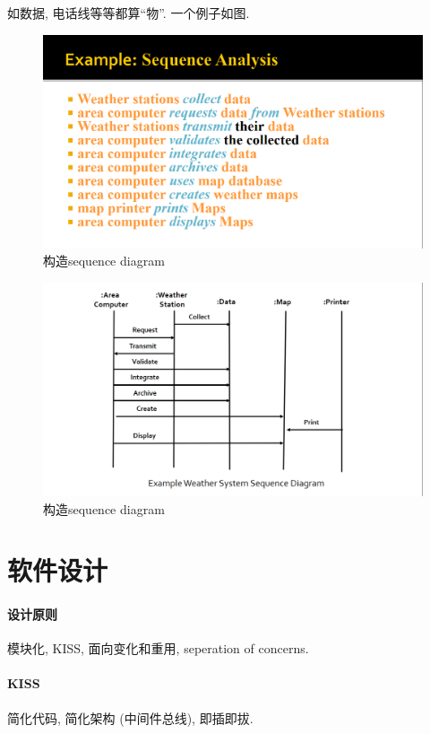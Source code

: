 \documentclass{ctexart}
\begin{document}
    如数据, 电话线等等都算``物''. 一个例子如图.
    \begin{figure}[ht!]
        \centering
        \includegraphics[width=\textwidth, height=\textheight, keepaspectratio]{seqdiag2.png}
        \caption{构造sequence diagram}
    \end{figure}
    \begin{figure}[ht!]
        \centering
        \includegraphics[width=\textwidth, height=\textheight, keepaspectratio]{seqdiag3.png}
        \caption{构造sequence diagram}
    \end{figure}

\section{软件设计}
\paragraph{设计原则} 模块化, KISS, 面向变化和重用, seperation of concerns.
\paragraph{KISS} 简化代码, 简化架构 (中间件总线), 即插即拔.
\end{document}
